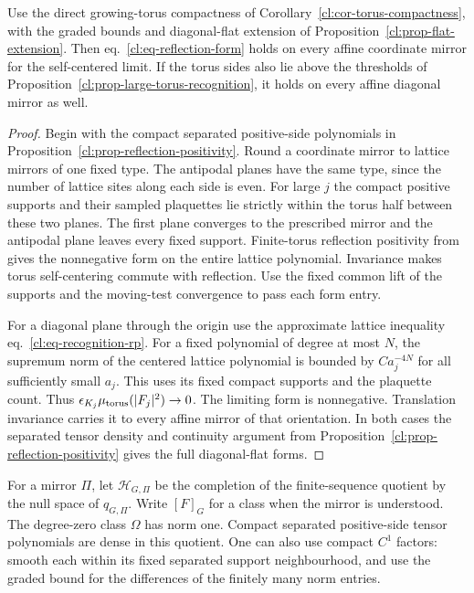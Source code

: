 \documentclass[11pt,letterpaper,reqno]{amsart}
\makeatletter
\numberwithin{equation}{section}
\renewcommand{\eqref}[1]{\textup{eq.~\ref{#1}}}
\theoremstyle{definition}
\newcommand{\ms@majorstart}{%
  \pushQED{\qed}\renewcommand{\qedsymbol}{$\blacksquare\square$}}
\newenvironment{corollary}[1][]{\ms@majorstart\ms@corollary[#1]}
  {\popQED\endms@corollary}
\theoremstyle{remark}
\makeatother
\begin{document}
\begin{corollary}[Reflection positivity of growing-torus limits]
\label{cl:cor-torus-reflection}
Use the direct growing-torus compactness of
Corollary~\ref{cl:cor-torus-compactness}, with the graded
bounds and diagonal-flat extension of
Proposition~\ref{cl:prop-flat-extension}.
Then \eqref{cl:eq-reflection-form} holds on every affine
coordinate mirror for the self-centered limit.
If the torus sides also lie above the thresholds of
Proposition~\ref{cl:prop-large-torus-recognition},
it holds on every affine diagonal mirror as well.
\end{corollary}

\begin{proof}
Begin with the compact separated positive-side polynomials
in Proposition~\ref{cl:prop-reflection-positivity}.
Round a coordinate mirror to lattice mirrors of one fixed
type. The antipodal planes have the same type, since the
number of lattice sites along each side is even. For
large \(j\) the compact positive supports and their
sampled plaquettes lie strictly within the torus half
between these two planes. The first plane converges to
the prescribed mirror and the antipodal plane leaves
every fixed support. Finite-torus reflection positivity
from \cite[Proposition 3.1]{LP} gives the nonnegative
form on the entire lattice polynomial. Invariance
makes torus self-centering commute with reflection.
Use the fixed common lift of the supports and
the moving-test convergence to pass each form entry.

For a diagonal plane through the origin use the
approximate lattice inequality
\eqref{cl:eq-recognition-rp}. For a fixed polynomial of
degree at most \(N\), the supremum norm of the centered
lattice polynomial is bounded by \(C a_j^{-4N}\) for
all sufficiently small \(a_j\). This uses its fixed
compact supports and the plaquette count. Thus
\(\epsilon_{K_j}\mu_{\rm torus}(|F_j|^2)\to0\).
The limiting form is nonnegative. Translation invariance
carries it to every affine mirror of that orientation.
In both cases the separated tensor density and continuity
argument from Proposition~\ref{cl:prop-reflection-positivity}
gives the full diagonal-flat forms.
\end{proof}

For a mirror \(\Pi\), let \(\mathcal H_{G,\Pi}\) be the completion
of the finite-sequence quotient by the null space of
\(q_{G,\Pi}\). Write \([F]_G\) for a class when the mirror is
understood. The degree-zero class \(\Omega\) has norm one.
Compact separated positive-side tensor polynomials are dense
in this quotient. One can also use compact \(C^1\) factors:
smooth each within its fixed separated support neighbourhood,
and use the graded bound for the differences of the finitely
many norm entries.
\end{document}
